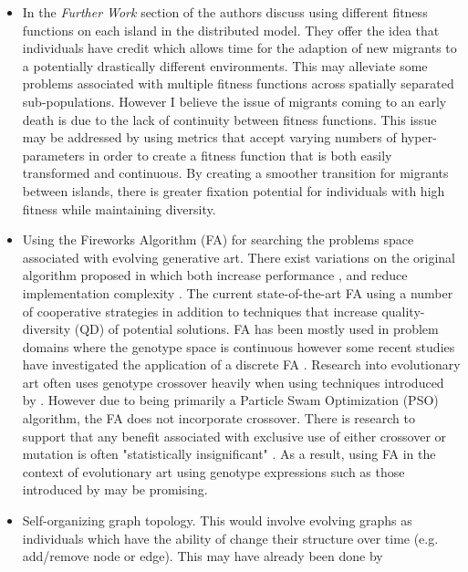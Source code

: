 \documentclass[10pt,a4paper]{article}
\begin{document}
\begin{itemize}
		\item In the \textit{Further Work} section of \citep{distributed-evolutionary-art} the authors discuss using different fitness functions on each island in the distributed model.
		They offer the idea that individuals have credit which allows time for the adaption of new migrants to a potentially drastically different environments.
		This may alleviate some problems associated with multiple fitness functions across spatially separated sub-populations.
		However I believe the issue of migrants coming to an early death is due to the lack of continuity between fitness functions.
		This issue may be addressed by using metrics that accept varying numbers of hyper-parameters in order to create a fitness function that is both easily transformed and continuous.
		By creating a smoother transition for migrants between islands, there is greater fixation potential for individuals with high fitness while maintaining diversity.
		
		\item Using the Fireworks Algorithm (FA) \citep{fireworks} for searching the problems space associated with evolving generative art.
		There exist variations on the original algorithm proposed in \citep{fireworks} which both increase performance \citep{fireworks-adaptive, fireworks-enhanced, fireworks-cooperative}, and reduce implementation complexity \citep{fireworks-bare-bones}.
		The current state-of-the-art FA using a number of cooperative strategies \citep{fireworks-cooperative} in addition to techniques that increase quality-diversity (QD) of potential solutions.
		FA has been mostly used in problem domains where the genotype space is continuous however some recent studies have investigated the application of a discrete FA \citep{fireworks-discrete-combinatorial, fireworks-discrete-tsp}.
		Research into evolutionary art often uses genotype crossover heavily when using techniques introduced by \citep{sims}.
		However due to being primarily a Particle Swam Optimization (PSO) algorithm, the FA does not incorporate crossover.
		There is research to support that any benefit associated with exclusive use of either crossover or mutation is often "statistically insignificant" \citep{mutation-vs-crossover,mutation-vs-crossover-revised}.
		As a result, using FA in the context of evolutionary art using genotype expressions such as those introduced by \citep{sims} may be promising.
		
		\item Self-organizing graph topology.
		This would involve evolving graphs as individuals which have the ability of change their structure over time (e.g. add/remove node or edge).
		This may have already been done by \citep{mabu2007graph}
		

\end{itemize}
\end{document}
